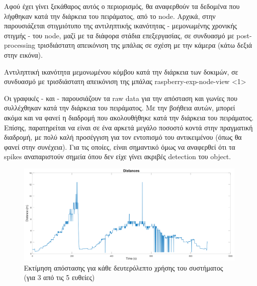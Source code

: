 Αφού έχει γίνει ξεκάθαρος αυτός ο περιορισμός, θα αναφερθούν τα δεδομένα που λήφθηκαν κατά την διάρκεια του πειράματος, από το node.
Αρχικά, στην  παρουσιάζεται στιγμιότυπο της αντιληπτικής ικανότητας - μεμονωμένης χρονικής στιγμής - του node, μαζί με τα διάφορα στάδια ε\-πε\-ξε\-ργα\-σίας, σε συνδυασμό με post-processing τρισδιάστατη απεικόνιση της μπάλας σε σχέση με την κάμερα (κάτω δεξιά στην εικόνα).

{Αντιληπτική ικανότητα μεμονωμένου κόμβου κατά την διάρκεια των δοκιμών, σε συνδυασμό με τρισδιάστατη απεικόνιση της μπάλας}%
{raspberry-exp-node-view}%
<1>

Οι γραφικές -  και  - παρουσιάζουν τα raw data για την α\-πό\-στα\-ση και γωνίες που συλλέχθηκαν κατά την διάρκεια του πειράματος. Με την βοήθεια αυτών, μπορεί ακόμα και να φανεί η διαδρομή που ακολουθήθηκε κατά την διάρκεια του πειράματος. Επίσης, παρατηρείται να είναι σε ένα αρκετά μεγάλο ποσοστό κοντά στην πραγματική διαδρομή, με πολύ καλή προ\-σέ\-γγι\-ση για τον ε\-ντο\-πι\-σμό του αντικειμένου (όπως θα φανεί στην συνέχεια). Για τις οποίες, είναι σημαντικό όμως να αναφερθεί ότι τα spikes αναπαριστούν σημεία όπου δεν είχε γίνει ακριβές detection του object.

\begin{figure}[H]
  \centering
  \includegraphics[width=\linewidth]{../Images/Experiments-Results/raspberry-exp-dist.png}
  \decoRule
  \caption[Εκτίμηση απόστασης για κάθε δευτερόλεπτο χρήσης του συστήματος]{Εκτίμηση απόστασης για κάθε δευτερόλεπτο χρήσης του συστήματος (για 3 από τις 5 ευθείες)}
  \label{fig:dist-experiment-example}
\end{figure}


